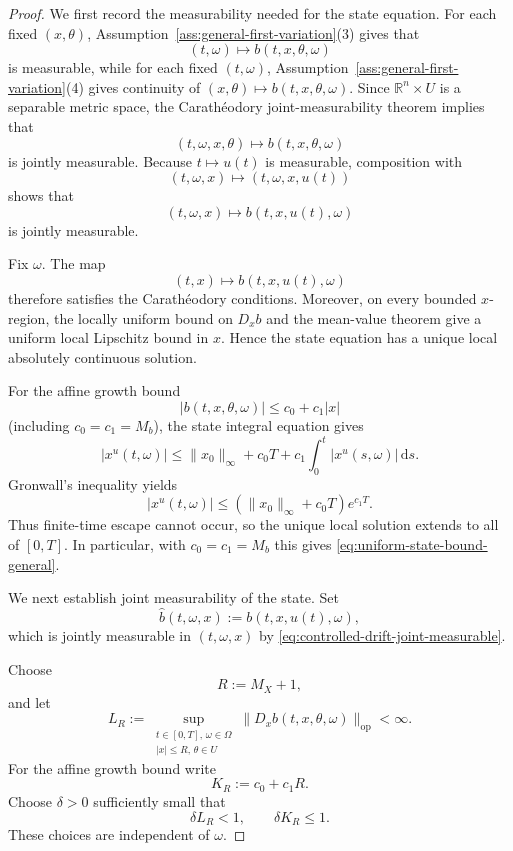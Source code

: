 \documentclass[11pt]{amsart}
\numberwithin{equation}{section} %
\newcommand{\dd}{\mathrm{d}}
\theoremstyle{remark}
\begin{document}
\begin{proof}
We first record the measurability needed for the state equation.
For each fixed $(x,\theta)$, Assumption~\ref{ass:general-first-variation}(3)
gives that
\[
(t,\omega)\longmapsto b(t,x,\theta,\omega)
\]
is measurable, while for each fixed $(t,\omega)$,
Assumption~\ref{ass:general-first-variation}(4) gives continuity of
$(x,\theta)\mapsto b(t,x,\theta,\omega)$. Since
$\mathbb R^n\times U$ is a separable metric space, the
Carath\'eodory joint-measurability theorem implies that
\[
(t,\omega,x,\theta)
\longmapsto b(t,x,\theta,\omega)
\]
is jointly measurable. Because $t \mapsto u(t)$ is measurable, composition with
\[
(t,\omega,x)\longmapsto (t,\omega,x,u(t))
\]
shows that
\begin{equation}
\label{eq:controlled-drift-joint-measurable}
(t,\omega,x)\longmapsto b(t,x,u(t),\omega)
\end{equation}
is jointly measurable.

Fix $\omega$. The map
\[
(t,x)\longmapsto b(t,x,u(t),\omega)
\]
therefore satisfies the Carath\'eodory conditions. Moreover, on every
bounded $x$-region, the locally uniform bound on $D_x b$ and the
mean-value theorem give a uniform local Lipschitz bound in $x$.
Hence the state equation has a unique local absolutely continuous
solution.

For the affine growth bound
\[
|b(t,x,\theta,\omega)|\le c_0+c_1|x|
\]
(including $c_0=c_1=M_b$), the state integral equation gives
\[
|x^u(t,\omega)|
\le
\|x_0\|_\infty+c_0T
+c_1\int_0^t |x^u(s,\omega)|\,\dd s.
\]
Gronwall's inequality yields
\[
|x^u(t,\omega)|
\le
(\|x_0\|_\infty+c_0T)e^{c_1T}.
\]
Thus finite-time escape cannot occur, so the unique local solution
extends to all of $[0,T]$. In particular, with $c_0=c_1=M_b$ this
gives \eqref{eq:uniform-state-bound-general}.

We next establish joint measurability of the state.  Set
\[
\widehat b(t,\omega,x)
:=
b(t,x,u(t),\omega),
\]
which is jointly measurable in $(t,\omega,x)$ by
\eqref{eq:controlled-drift-joint-measurable}.

Choose
\[
R:=M_X+1,
\]
and let
\[
L_R
:=
\sup_{\substack{t\in[0,T],\,\omega\in\Omega\\
                 |x|\le R,\,\theta\in U}}
\|D_x b(t,x,\theta,\omega)\|_{\mathrm{op}}
<\infty.
\]
For the affine growth bound write
\[
K_R:=c_0+c_1R.
\]
Choose $\delta>0$ sufficiently small that
\[
\delta L_R<1,
\qquad
\delta K_R\le 1.
\]
These choices are independent of $\omega$.


\end{proof}
\end{document}
